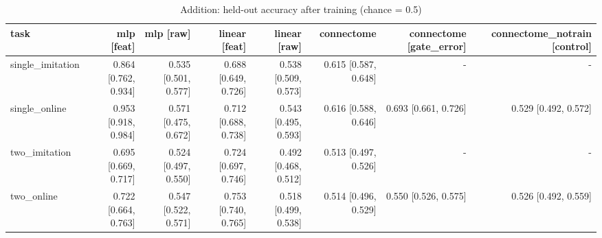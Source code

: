 \begin{table}[t]
\centering
\small
\begin{tabular}{lrrrrrrr}
\toprule
task & mlp [feat] & mlp [raw] & linear [feat] & linear [raw] & connectome & connectome [gate\_error] & connectome\_notrain [control] \\
\midrule
single\_imitation & 0.864 [0.762, 0.934] & 0.535 [0.501, 0.577] & 0.688 [0.649, 0.726] & 0.538 [0.509, 0.573] & 0.615 [0.587, 0.648] & - & - \\
single\_online & 0.953 [0.918, 0.984] & 0.571 [0.475, 0.672] & 0.712 [0.688, 0.738] & 0.543 [0.495, 0.593] & 0.616 [0.588, 0.646] & 0.693 [0.661, 0.726] & 0.529 [0.492, 0.572] \\
two\_imitation & 0.695 [0.669, 0.717] & 0.524 [0.497, 0.550] & 0.724 [0.697, 0.746] & 0.492 [0.468, 0.512] & 0.513 [0.497, 0.526] & - & - \\
two\_online & 0.722 [0.664, 0.763] & 0.547 [0.522, 0.571] & 0.753 [0.740, 0.765] & 0.518 [0.499, 0.538] & 0.514 [0.496, 0.529] & 0.550 [0.526, 0.575] & 0.526 [0.492, 0.559] \\
\bottomrule
\end{tabular}
\caption{Addition: held-out accuracy after training (chance = 0.5)}
\label{tab:addition_final_acc}
\end{table}